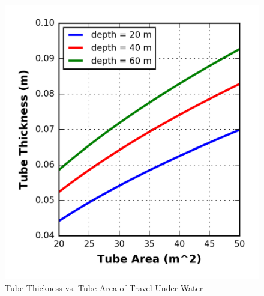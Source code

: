 \begin{figure}
	\centering
	\includegraphics{../../images/graphs/underwater_structural_trades/tube_area_vs_depth.png}
	\caption{Tube Thickness vs. Tube Area of Travel Under Water}
	\label{fig:tube_thick_vs_tube_area_underwater}
\end{figure}


